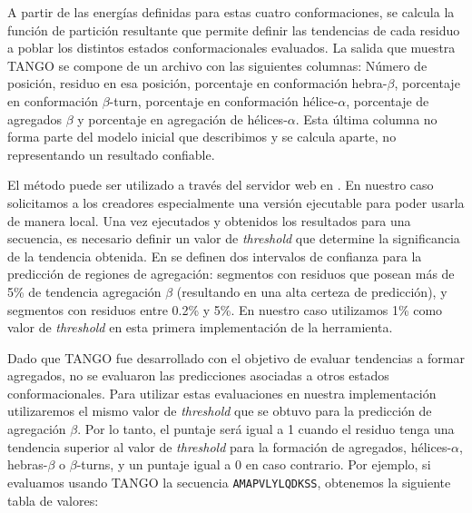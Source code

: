 A partir de las energías definidas para estas cuatro conformaciones, se calcula la función de partición resultante que permite definir las tendencias de cada residuo a poblar los distintos estados conformacionales evaluados.
La salida que muestra TANGO se compone de un archivo con las siguientes columnas:
Número de posición, residuo en esa posición, porcentaje en conformación hebra-$\beta$, porcentaje en conformación $\beta$-turn, porcentaje en conformación hélice-$\alpha$, porcentaje de agregados $\beta$ y
porcentaje en agregación de hélices-$\alpha$.
Esta última columna no forma parte del modelo inicial que describimos y se calcula aparte, no representando un resultado confiable.

El método puede ser utilizado a través del servidor web en \cite{tangoWeb}. En nuestro caso solicitamos a los creadores especialmente una versión ejecutable para poder usarla de manera local.
Una vez ejecutados y obtenidos los resultados para una secuencia, es necesario definir un valor de \textit{threshold} que determine la significancia de la tendencia obtenida.
En \cite{fernandez2004prediction} se definen dos intervalos de confianza para la predicción de regiones de agregación: segmentos con residuos que posean más de 5\% de tendencia agregación $\beta$ (resultando en una alta certeza de predicción),
y segmentos con residuos entre 0.2\% y 5\%. En nuestro caso utilizamos 1\% como valor de \textit{threshold} en esta primera implementación de la herramienta.

Dado que TANGO fue desarrollado con el objetivo de evaluar tendencias a formar agregados, no se evaluaron las predicciones asociadas a otros estados conformacionales. 
Para utilizar estas evaluaciones en nuestra implementación utilizaremos el mismo valor de \textit{threshold} que se obtuvo para la predicción de agregación $\beta$. 
Por lo tanto, el puntaje será igual a 1 cuando el residuo tenga una tendencia superior al valor de \textit{threshold} para la formación de agregados, hélices-$\alpha$, hebras-$\beta$ o $\beta$-turns, 
y un puntaje igual a 0 en caso contrario.
Por ejemplo, si evaluamos usando TANGO la secuencia \texttt{AMAPVLYLQDKSS}, obtenemos la siguiente tabla de valores:

